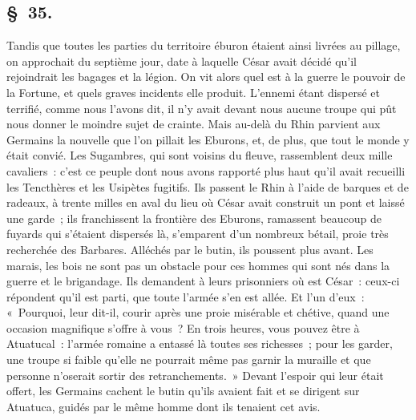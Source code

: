 \documentclass[french,twoside]{book} %
\begin{document}
\subsection[{§ 35.}]{ \textsc{§ 35.} }
\noindent Tandis que toutes les parties du territoire éburon étaient ainsi livrées au pillage, on approchait du septième jour, date à laquelle César avait décidé qu’il rejoindrait les bagages et la légion. On vit alors quel est à la guerre le pouvoir de la Fortune, et quels graves incidents elle produit. L'ennemi étant dispersé et terrifié, comme nous l’avons dit, il n’y avait devant nous aucune troupe qui pût nous donner le moindre sujet de crainte. Mais au-delà du Rhin parvient aux Germains la nouvelle que l’on pillait les Eburons, et, de plus, que tout le monde y était convié. Les Sugambres, qui sont voisins du fleuve, rassemblent deux mille cavaliers : c’est ce peuple dont nous avons rapporté plus haut qu’il avait recueilli les Tencthères et les Usipètes fugitifs. Ils passent le Rhin à l’aide de barques et de radeaux, à trente milles en aval du lieu où César avait construit un pont et laissé une garde ; ils franchissent la frontière des Eburons, ramassent beaucoup de fuyards qui s’étaient dispersés là, s’emparent d’un nombreux bétail, proie très recherchée des Barbares. Alléchés par le butin, ils poussent plus avant. Les marais, les bois ne sont pas un obstacle pour ces hommes qui sont nés dans la guerre et le brigandage. Ils demandent à leurs prisonniers où est César : ceux-ci répondent qu’il est parti, que toute l’armée s’en est allée. Et l’un d’eux : « Pourquoi, leur dit-il, courir après une proie misérable et chétive, quand une occasion magnifique s’offre à vous ? En trois heures, vous pouvez être à Atuatucal : l’armée romaine a entassé là toutes ses richesses ; pour les garder, une troupe si faible qu’elle ne pourrait même pas garnir la muraille et que personne n’oserait sortir des retranchements. » Devant l’espoir qui leur était offert, les Germains cachent le butin qu’ils avaient fait et se dirigent sur Atuatuca, guidés par le même homme dont ils tenaient cet avis.
\end{document}

